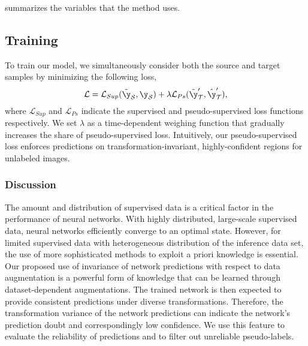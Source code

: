  summarizes the variables that the method uses.

\subsection{Training}
To train our model, we simultaneously consider both the source and target samples by minimizing the following loss,
\begin{equation}
    \mathcal{L} = \mathcal{L}_{Sup}( \tilde{\y}_\mathcal{S}, \y_\mathcal{S}) + \lambda \mathcal{L}_{Ps}(\tilde{\y}'_{\mathcal{T}}, \hat{\y}'_{\mathcal{T}}),
    \label{eq: loss}
\end{equation}
\noindent
where $\mathcal{L}_{Sup}$ and $\mathcal{L}_{Ps}$ indicate the supervised and pseudo-supervised loss functions respectively. We set $\lambda$ as a time-dependent weighing function that gradually increases the share of pseudo-supervised loss. Intuitively, our pseudo-supervised loss enforces predictions on transformation-invariant, highly-confident regions for unlabeled images. 



\subsubsection{Discussion} 
The amount and distribution of supervised data is a critical factor in the performance of neural networks. With highly distributed, large-scale supervised data, neural networks efficiently converge to an optimal state. However, for limited supervised data with heterogeneous distribution of the inference data set, the use of more sophisticated methods to exploit a priori knowledge is essential. Our proposed use of invariance of network predictions with respect to data augmentation is a powerful form of knowledge that can be learned through dataset-dependent augmentations. The trained network is then expected to provide consistent predictions under diverse transformations. Therefore, the transformation variance of the network predictions can indicate the network's prediction doubt and correspondingly low confidence. We use this feature to evaluate the reliability of predictions and to filter out unreliable pseudo-labels.